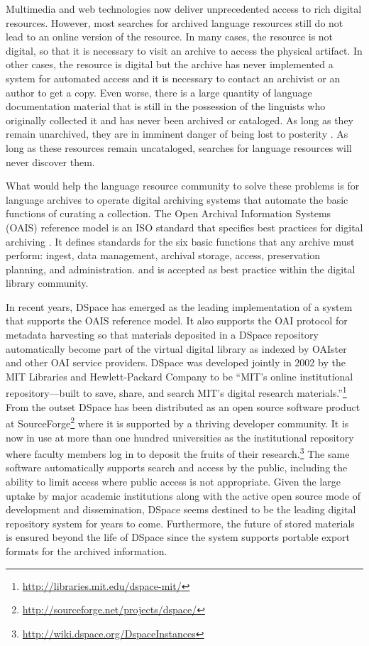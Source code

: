Multimedia and web technologies now deliver unprecedented access to
rich digital resources.  However, most searches for archived language
resources still do not lead to an online version of the resource.  In
many cases, the resource is not digital, so that it is necessary to
visit an archive to access the physical artifact.  In other cases, the
resource is digital but the archive has never implemented a system for
automated access and it is necessary to contact an archivist or an
author to get a copy.  Even worse, there is a large quantity of
language documentation material that is still in the possession of the linguists who
originally collected it and has never been archived or cataloged.
As long as they remain unarchived, they are in imminent danger of
being lost to posterity \citep{Simons06}.  As long as these 
resources remain uncataloged, searches for language resources 
will never discover them.


What would help the language resource community to solve these problems is
for language archives to operate digital archiving systems that
automate the basic functions of curating a collection.  The Open
Archival Information Systems (OAIS) reference model is
an ISO standard that specifies best practices for
digital archiving \citep{OAIS02}.  It defines standards for the six basic functions
that any archive must perform: ingest, data management, archival
storage, access, preservation planning, and administration. and is
accepted as best practice within the digital library community.

In recent years, DSpace has emerged as the leading implementation of
a system that supports the OAIS reference model.  It also supports
the OAI protocol for metadata harvesting so that materials deposited
in a DSpace repository automatically become part of the virtual
digital library as indexed by OAIster and other OAI service providers.
DSpace was developed 
jointly in 2002 by the MIT Libraries and Hewlett-Packard Company to be
``MIT's online institutional repository---built to save, share, and
search MIT's digital research materials.''\footnote{\scriptsize\url{http://libraries.mit.edu/dspace-mit/}}
From the outset DSpace has been distributed as an open source software
product at
SourceForge\footnote{\scriptsize\url{http://sourceforge.net/projects/dspace/}}
where it is supported by a thriving developer community.  It is now in use at
more than one hundred universities as the institutional repository
where faculty members log in to deposit the fruits of their
research.\footnote{\scriptsize\url{http://wiki.dspace.org/DspaceInstances}}
The same software automatically supports search and access by the public,
including the ability to limit access where public access is not 
appropriate.  Given the large uptake by
major academic institutions along with the active open source mode of
development and dissemination, DSpace seems destined to be the leading
digital repository system for years to come. Furthermore, the future of
stored materials is ensured beyond the life of DSpace since the system
supports portable export formats for the archived information.

